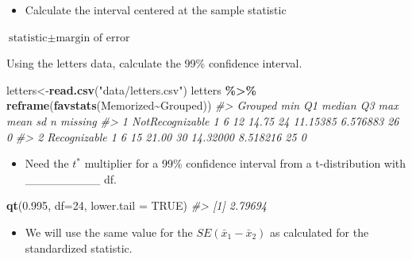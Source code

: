 \documentclass[
]{report}
\newenvironment{Shaded}{\begin{snugshade}}{\end{snugshade}}
\newcommand{\AttributeTok}[1]{\textcolor[rgb]{0.13,0.29,0.53}{#1}}
\newcommand{\CommentTok}[1]{\textcolor[rgb]{0.56,0.35,0.01}{\textit{#1}}}
\newcommand{\ConstantTok}[1]{\textcolor[rgb]{0.56,0.35,0.01}{#1}}
\newcommand{\DecValTok}[1]{\textcolor[rgb]{0.00,0.00,0.81}{#1}}
\newcommand{\FloatTok}[1]{\textcolor[rgb]{0.00,0.00,0.81}{#1}}
\newcommand{\FunctionTok}[1]{\textcolor[rgb]{0.13,0.29,0.53}{\textbf{#1}}}
\newcommand{\NormalTok}[1]{#1}
\newcommand{\OtherTok}[1]{\textcolor[rgb]{0.56,0.35,0.01}{#1}}
\newcommand{\SpecialCharTok}[1]{\textcolor[rgb]{0.81,0.36,0.00}{\textbf{#1}}}
\newcommand{\StringTok}[1]{\textcolor[rgb]{0.31,0.60,0.02}{#1}}
\providecommand{\tightlist}{%
  \setlength{\itemsep}{0pt}\setlength{\parskip}{0pt}}
\newcommand{\rgi}{\hspace{24pt}}  %
\begin{document}
\begin{itemize}
\tightlist
\item
  Calculate the interval centered at the sample statistic
\end{itemize}

\rgi \(\text{statistic} \pm \text{margin of error}\)

\vspace{0.8in}

Using the letters data, calculate the 99\% confidence interval.

\begin{Shaded}
\begin{Highlighting}[]
\NormalTok{letters}\OtherTok{\textless{}{-}}\FunctionTok{read.csv}\NormalTok{(}\StringTok{"data/letters.csv"}\NormalTok{)}
\NormalTok{letters }\SpecialCharTok{\%\textgreater{}\%}
    \FunctionTok{reframe}\NormalTok{(}\FunctionTok{favstats}\NormalTok{(Memorized}\SpecialCharTok{\textasciitilde{}}\NormalTok{Grouped))}
\CommentTok{\#\textgreater{}           Grouped min Q1 median    Q3 max     mean       sd  n missing}
\CommentTok{\#\textgreater{} 1 NotRecognizable   1  6     12 14.75  24 11.15385 6.576883 26       0}
\CommentTok{\#\textgreater{} 2    Recognizable   1  6     15 21.00  30 14.32000 8.518216 25       0}
\end{Highlighting}
\end{Shaded}

\begin{itemize}
\tightlist
\item
  Need the \(t^*\) multiplier for a 99\% confidence interval from a t-distribution with \_\_\_\_\_\_\_\_\_ df.
\end{itemize}

\begin{Shaded}
\begin{Highlighting}[]
\FunctionTok{qt}\NormalTok{(}\FloatTok{0.995}\NormalTok{, }\AttributeTok{df=}\DecValTok{24}\NormalTok{, }\AttributeTok{lower.tail =} \ConstantTok{TRUE}\NormalTok{)}
\CommentTok{\#\textgreater{} [1] 2.79694}
\end{Highlighting}
\end{Shaded}

\begin{itemize}
\tightlist
\item
  We will use the same value for the \(SE(\bar{x}_1-\bar{x}_2)\) as calculated for the standardized statistic.
\end{itemize}

\vspace{1in}
\end{document}
